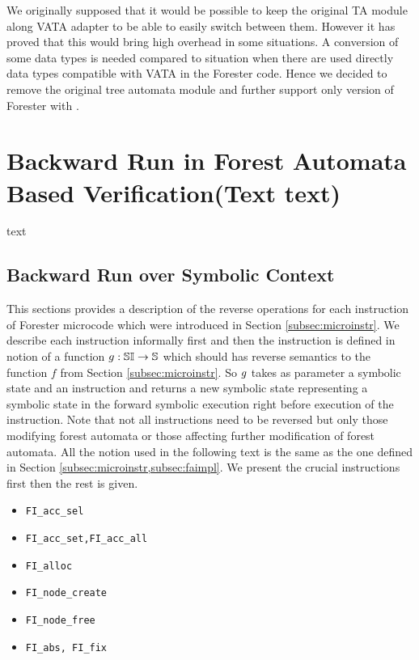 We originally supposed that it would be possible to keep the original TA module along VATA adapter
to be able to easily switch between them.
However it has proved that this would bring high overhead in some situations.
A conversion of some data types is needed compared to situation when there are used directly data types compatible with VATA in the Forester code.
Hence we decided to remove the original tree automata module and further support only version of Forester with \vata.

\chapter{Backward Run in Forest Automata Based Verification(Text text)}
\label{ch:backward}
text

\section{Backward Run over Symbolic Context}

This sections provides a description of the reverse operations for
each instruction of Forester microcode which were introduced in Section \ref{subsec:microinstr}.
We describe each instruction informally first and then the instruction is defined in notion
of a function $g: \mathbb{S} \mathbb{I} \rightarrow \mathbb{S}$ which should has reverse semantics to the function $f$ from Section \ref{subsec:microinstr}.
So $g$ takes as parameter a symbolic state and an instruction and returns a new symbolic state representing
a symbolic state in the forward symbolic execution right before execution of the instruction.
Note that not all instructions need to be reversed but only those
modifying forest automata or those affecting further modification of forest automata.
All the notion used in the following text is the same as the one defined in Section \ref{subsec:microinstr,subsec:faimpl}.
We present the crucial instructions first then the rest is given.
\begin{itemize}
	\item {\tt FI\_acc\_sel}
		
	\item {\tt FI\_acc\_set,FI\_acc\_all}

	\item {\tt FI\_alloc}

	\item {\tt FI\_node\_create}
	
	\item {\tt FI\_node\_free}

	\item {\tt FI\_abs, FI\_fix}

\end{itemize}

